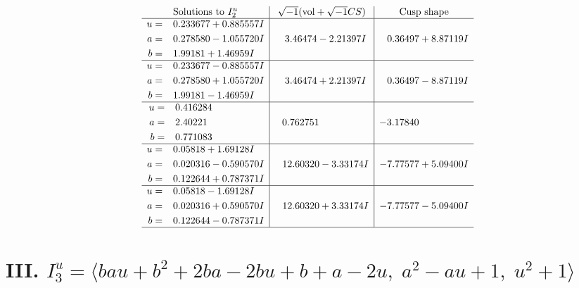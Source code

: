 \documentclass[1p]{elsarticle_modified}
\theoremstyle{definition}
\newcommand{\I}{\sqrt{-1}}
\begin{document}
$$\begin{array}{c|c|c}  
\text{Solutions to }I^u_{2}& \I (\text{vol} + \sqrt{-1}CS) & \text{Cusp shape}\\
 \hline 
\begin{aligned}
u &= \phantom{-}0.233677 + 0.885557 I \\
a &= \phantom{-}0.278580 - 1.055720 I \\
b &= \phantom{-}1.99181 + 1.46959 I\end{aligned}
 & \phantom{-}3.46474 - 2.21397 I & \phantom{-}0.36497 + 8.87119 I \\ \hline\begin{aligned}
u &= \phantom{-}0.233677 - 0.885557 I \\
a &= \phantom{-}0.278580 + 1.055720 I \\
b &= \phantom{-}1.99181 - 1.46959 I\end{aligned}
 & \phantom{-}3.46474 + 2.21397 I & \phantom{-}0.36497 - 8.87119 I \\ \hline\begin{aligned}
u &= \phantom{-}0.416284\phantom{ +0.000000I} \\
a &= \phantom{-}2.40221\phantom{ +0.000000I} \\
b &= \phantom{-}0.771083\phantom{ +0.000000I}\end{aligned}
 & \phantom{-}0.762751\phantom{ +0.000000I} & -3.17840\phantom{ +0.000000I} \\ \hline\begin{aligned}
u &= \phantom{-}0.05818 + 1.69128 I \\
a &= \phantom{-}0.020316 - 0.590570 I \\
b &= \phantom{-}0.122644 + 0.787371 I\end{aligned}
 & \phantom{-}12.60320 - 3.33174 I & -7.77577 + 5.09400 I \\ \hline\begin{aligned}
u &= \phantom{-}0.05818 - 1.69128 I \\
a &= \phantom{-}0.020316 + 0.590570 I \\
b &= \phantom{-}0.122644 - 0.787371 I\end{aligned}
 & \phantom{-}12.60320 + 3.33174 I & -7.77577 - 5.09400 I\\
 \hline 
 \end{array}$$\newpage\newpage\renewcommand{\arraystretch}{1}
\centering \section*{III. $I^u_{3}= \langle b a u+b^2+2 b a-2 b u+b+a-2 u,\;a^2- a u+1,\;u^2+1 \rangle$}
\end{document}
